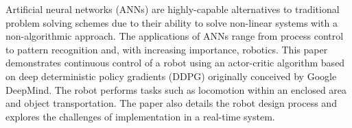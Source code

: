 Artificial neural networks (ANNs) are highly-capable alternatives to traditional problem solving schemes due to their ability to solve non-linear systems with a non-algorithmic approach. The applications of ANNs range from process control to pattern recognition and, with increasing importance, robotics. This paper demonstrates continuous control of a robot using an actor-critic algorithm based on deep deterministic policy gradients (DDPG) originally conceived by Google DeepMind. The robot performs tasks such as locomotion within an enclosed area and object transportation. The paper also details the robot design process and explores the challenges of implementation in a real-time system.